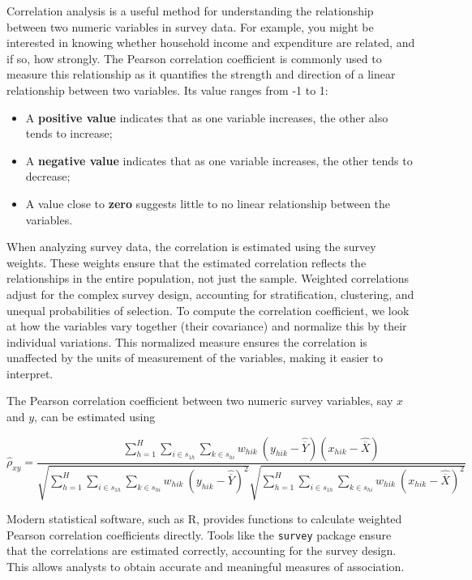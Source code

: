 \documentclass[
  12pt,
]{book}
\begin{document}
Correlation analysis is a useful method for understanding the relationship between two numeric variables in survey data. For example, you might be interested in knowing whether household income and expenditure are related, and if so, how strongly. The Pearson correlation coefficient is commonly used to measure this relationship as it quantifies the strength and direction of a linear relationship between two variables. Its value ranges from -1 to 1:

\begin{itemize}
\item
  A \textbf{positive value} indicates that as one variable increases, the other also tends to increase;
\item
  A \textbf{negative value} indicates that as one variable increases, the other tends to decrease;
\item
  A value close to \textbf{zero} suggests little to no linear relationship between the variables.
\end{itemize}

When analyzing survey data, the correlation is estimated using the survey weights. These weights ensure that the estimated correlation reflects the relationships in the entire population, not just the sample. Weighted correlations adjust for the complex survey design, accounting for stratification, clustering, and unequal probabilities of selection. To compute the correlation coefficient, we look at how the variables vary together (their covariance) and normalize this by their individual variations. This normalized measure ensures the correlation is unaffected by the units of measurement of the variables, making it easier to interpret.

The Pearson correlation coefficient between two numeric survey variables, say \(x\) and \(y\), can be estimated using

\[
\widehat{\rho}_{xy} = \frac {\sum_{h=1}^{H}\sum_{i \in s_{1h}} \sum_{ k \in s_{hi}}  w_{hik} \ \left( y_{hik} - \widehat{\overline{Y}} \right) \left( x_{hik} - \widehat{\overline{X}} \right)} {\sqrt{\sum_{h=1}^{H}\sum_{i \in s_{1h}} \sum_{ k \in s_{hi}}  w_{hik} \ \left( y_{hik} - \widehat{\overline{Y}} \right)^2} \sqrt{\sum_{h=1}^{H}\sum_{i \in s_{1h}} \sum_{ k \in s_{hi}}  w_{hik} \ \left( x_{hik} - \widehat{\overline{X}} \right)^2}}
\]

Modern statistical software, such as R, provides functions to calculate weighted Pearson correlation coefficients directly. Tools like the \texttt{survey} package ensure that the correlations are estimated correctly, accounting for the survey design. This allows analysts to obtain accurate and meaningful measures of association.
\end{document}
